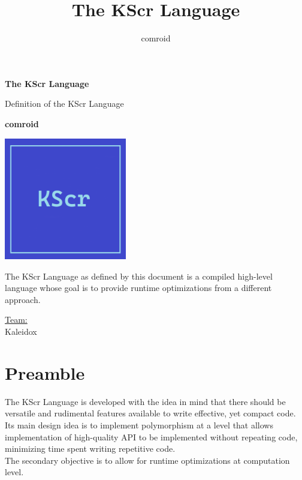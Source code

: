 \documentclass{docs}
\begin{document}
    \title{The KScr Language}
    \author{comroid}
    \begin{titlepage}
        \begin{center}
            \vspace*{1cm}
            
            \Huge
            \textbf{The KScr Language}
            
            \vspace{0.5cm}
            \LARGE
            Definition of the KScr Language
            
            \vspace{1.5cm}
            
            \textbf{comroid}
            
            \vspace{0.8cm}
            
            \includegraphics[width=0.4\textwidth]{img/kscr-icon.png}
            
            \vfill
            
            The KScr Language as defined by this document is a compiled high-level language whose goal is to provide runtime optimizations from a different approach.
            
            \vspace{1.2cm}
            
            \Large
            \underline{Team:} \\
            Kaleidox
        \end{center}
    \end{titlepage}
    \tableofcontents

    \pagebreak
    \section{Preamble}
    The KScr Language is developed with the idea in mind that there should be versatile and rudimental features available to write effective, yet compact code. \\
    Its main design idea is to implement polymorphism at a level that allows implementation of high-quality API to be implemented without repeating code, minimizing time spent writing repetitive code. \\
    The secondary objective is to allow for runtime optimizations at computation level.
\end{document}
